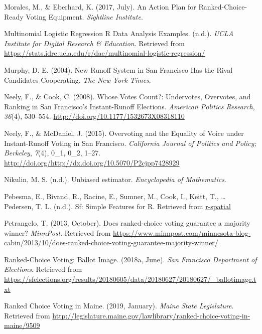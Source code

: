 \documentclass[12pt,twoside]{reedthesis}
\begin{document}
\leavevmode\hypertarget{ref-morales_action_2017}{}%
Morales, M., \& Eberhard, K. (2017, July). An Action Plan for Ranked-Choice-Ready Voting Equipment. \emph{Sightline Institute}.

\leavevmode\hypertarget{ref-noauthor_multinomial_nodate}{}%
Multinomial Logistic Regression \textbar{} R Data Analysis Examples. (n.d.). \emph{UCLA Institute for Digital Research \& Education}. Retrieved from \url{https://stats.idre.ucla.edu/r/dae/multinomial-logistic-regression/}

\leavevmode\hypertarget{ref-murphy_new_2004}{}%
Murphy, D. E. (2004). New Runoff System in San Francisco Has the Rival Candidates Cooperating. \emph{The New York Times}.

\leavevmode\hypertarget{ref-neely_whose_2008}{}%
Neely, F., \& Cook, C. (2008). Whose Votes Count?: Undervotes, Overvotes, and Ranking in San Francisco's Instant-Runoff Elections. \emph{American Politics Research}, \emph{36}(4), 530--554. \url{http://doi.org/10.1177/1532673X08318110}

\leavevmode\hypertarget{ref-neely_overvoting_2015}{}%
Neely, F., \& McDaniel, J. (2015). Overvoting and the Equality of Voice under Instant-Runoff Voting in San Francisco. \emph{California Journal of Politics and Policy; Berkeley}, \emph{7}(4), 0\_1, 0\_2, 1--27. \url{http://doi.org/http://dx.doi.org/10.5070/P2cjpp7428929}

\leavevmode\hypertarget{ref-nikulin_unbiased_nodate}{}%
Nikulin, M. S. (n.d.). Unbiased estimator. \emph{Encyclopedia of Mathematics}.

\leavevmode\hypertarget{ref-pebesma_sf_nodate}{}%
Pebesma, E., Bivand, R., Racine, E., Sumner, M., Cook, I., Keitt, T., \ldots{} Pedersen, T. L. (n.d.). Sf: Simple Features for R. Retrieved from \url{r-spatial}

\leavevmode\hypertarget{ref-petrangelo_does_2013}{}%
Petrangelo, T. (2013, October). Does ranked-choice voting guarantee a majority winner? \emph{MinnPost}. Retrieved from \url{https://www.minnpost.com/minnesota-blog-cabin/2013/10/does-ranked-choice-voting-guarantee-majority-winner/}

\leavevmode\hypertarget{ref-noauthor_ranked-choice_2018-1}{}%
Ranked-Choice Voting: Ballot Image. (2018a, June). \emph{San Francisco Department of Elections}. Retrieved from \url{https://sfelections.org/results/20180605/data/20180627/20180627/_ballotimage.txt}

\leavevmode\hypertarget{ref-noauthor_ranked_2019}{}%
Ranked Choice Voting in Maine. (2019, January). \emph{Maine State Legislature}. Retrieved from \url{http://legislature.maine.gov/lawlibrary/ranked-choice-voting-in-maine/9509}
\end{document}
